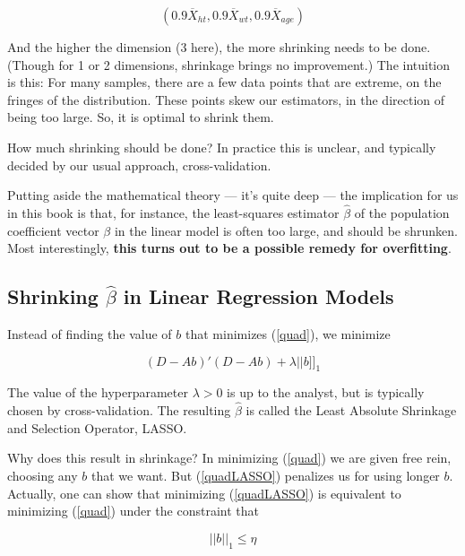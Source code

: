 \begin{equation}
(0.9 \overline{X}_{ht},0.9 \overline{X}_{wt}, 0.9 \overline{X}_{age})
\end{equation}

\noindent
And the higher the dimension (3 here), the more shrinking needs to be done.
(Though for 1 or 2 dimensions, shrinkage brings no improvement.)
The intuition is this:  For many samples, there are a few data points
that are extreme, on the fringes of the distribution.  These points skew
our estimators, in the direction of being too large.  So, it is optimal
to shrink them.

How much shrinking should be done?  In practice this is unclear, and
typically decided by our usual approach, cross-validation.

Putting aside the mathematical theory --- it's quite deep --- the
implication for us in this book is that, for instance, the least-squares
estimator $\widehat{\beta}$ of the population coefficient vector $\beta$
in the linear model is often too large, and should be shrunken.  Most
interestingly, \textbf{this turns out to be a possible remedy for
overfitting}.

\subsection{Shrinking $\widehat{\beta}$ in Linear Regression Models}

Instead of finding the value of $b$ that minimizes (\ref{quad}), we
minimize

\begin{equation}
\label{quadLASSO}
(D - Ab)'(D - Ab) + \lambda ||b]]_{1}
\end{equation}

The value of the hyperparameter $\lambda > 0$ is up to the analyst, but
is typically chosen by cross-validation.  The resulting $\widehat{\beta}$
is called the Least Absolute Shrinkage and Selection Operator, LASSO.

Why does this result in shrinkage?  In minimizing (\ref{quad}) we are
given free rein, choosing any $b$ that we want.  But (\ref{quadLASSO})
penalizes us for using longer $b$.  Actually, one can show that
minimizing (\ref{quadLASSO}) is equivalent to minimizing (\ref{quad})
under the constraint that 

\begin{equation}
\label{dual}
||b||_{1} \leq \eta
\end{equation}

